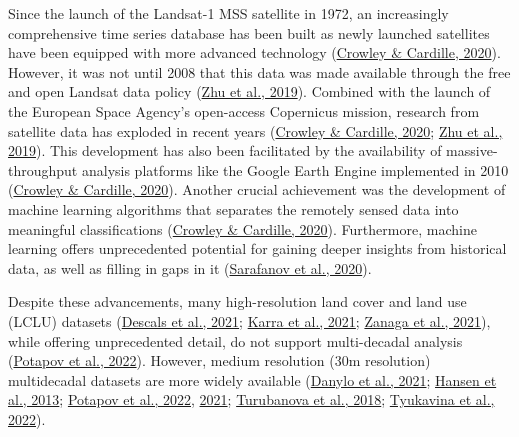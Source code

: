 \documentclass[
  letterpaper,
  DIV=11,
  numbers=noendperiod]{scrreprt}
\begin{document}
Since the launch of the Landsat-1 MSS satellite in 1972, an increasingly
comprehensive time series database has been built as newly launched
satellites have been equipped with more advanced technology
(\protect\hyperlink{ref-crowleyRemoteSensingRecent2020}{Crowley \&
Cardille, 2020}). However, it was not until 2008 that this data was made
available through the free and open Landsat data policy
(\protect\hyperlink{ref-zhuBenefitsFreeOpen2019}{Zhu et al., 2019}).
Combined with the launch of the European Space Agency's open-access
Copernicus mission, research from satellite data has exploded in recent
years (\protect\hyperlink{ref-crowleyRemoteSensingRecent2020}{Crowley \&
Cardille, 2020}; \protect\hyperlink{ref-zhuBenefitsFreeOpen2019}{Zhu et
al., 2019}). This development has also been facilitated by the
availability of massive-throughput analysis platforms like the Google
Earth Engine implemented in 2010
(\protect\hyperlink{ref-crowleyRemoteSensingRecent2020}{Crowley \&
Cardille, 2020}). Another crucial achievement was the development of
machine learning algorithms that separates the remotely sensed data into
meaningful classifications
(\protect\hyperlink{ref-crowleyRemoteSensingRecent2020}{Crowley \&
Cardille, 2020}). Furthermore, machine learning offers unprecedented
potential for gaining deeper insights from historical data, as well as
filling in gaps in it
(\protect\hyperlink{ref-sarafanovMachineLearningApproach2020}{Sarafanov
et al., 2020}).

Despite these advancements, many high-resolution land cover and land use
(LCLU) datasets
(\protect\hyperlink{ref-descalsHighresolutionGlobalMap2021}{Descals et
al., 2021}; \protect\hyperlink{ref-karraGlobalLandUse2021}{Karra et al.,
2021}; \protect\hyperlink{ref-zanagaESAWorldCover102021}{Zanaga et al.,
2021}), while offering unprecedented detail, do not support
multi-decadal analysis
(\protect\hyperlink{ref-potapovGlobal20002020Land2022}{Potapov et al.,
2022}). However, medium resolution (30m resolution) multidecadal
datasets are more widely available
(\protect\hyperlink{ref-danyloMapExtentYear2021}{Danylo et al., 2021};
\protect\hyperlink{ref-hansenHighResolutionGlobalMaps2013}{Hansen et
al., 2013};
\protect\hyperlink{ref-potapovGlobal20002020Land2022}{Potapov et al.,
2022}, \protect\hyperlink{ref-potapovGlobalMapsCropland2021}{2021};
\protect\hyperlink{ref-turubanovaOngoingPrimaryForest2018}{Turubanova et
al., 2018};
\protect\hyperlink{ref-tyukavinaGlobalTrendsForest2022}{Tyukavina et
al., 2022}).

\end{document}
